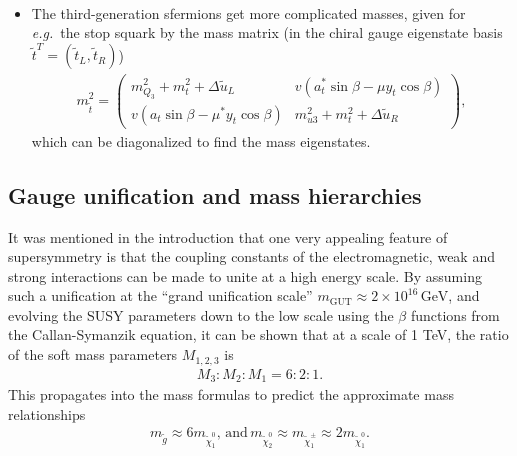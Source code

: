 \begin{itemize}
\begin{align}
 	\end{align}
 	\item The third-generation sfermions get more complicated masses, given for {\it e.g.}\ the stop squark by the mass matrix (in the chiral gauge eigenstate basis $\tilde t^T = (\tilde t_L, \tilde t_R)$)
 	\begin{align}
 		m^2_{\tilde t} = \begin{pmatrix}
 			m^2_{Q_3} + m_t^2 + \Delta \tilde u_L & v(a_t^* \sin\beta - \mu y_t \cos\beta)\\
 			v(a_t \sin\beta - \mu^* y_t \cos\beta) & m^2_{u3} + m^2_t + \Delta \tilde u_R
 		\end{pmatrix},
 	\end{align}
 	which can be diagonalized to find the mass eigenstates.
 \end{itemize}

 \subsection{Gauge unification and mass hierarchies}
 It was mentioned in the introduction that one very appealing feature of supersymmetry is that the coupling constants of the electromagnetic, weak and strong interactions can be made to unite at a high energy scale. By assuming such a unification at the ``grand unification scale'' $m_\mathrm{GUT} \approx 2\times 10^{16} \,\mathrm{GeV}$, and evolving the SUSY parameters down to the low scale using the $\beta$ functions from the Callan-Symanzik equation, it can be shown that at a scale of 1 TeV, the ratio of the soft mass parameters $M_{1,2,3}$ is
 \begin{align}
 	M_3 : M_2 : M_1 = 6 : 2 : 1.
 \end{align}
 This propagates into the mass formulas to predict the approximate mass relationships
 \begin{align}
 	m_{\tilde g} \approx 6m_{\tilde \chi_1^0}, \, \mathrm{and} \, m_{\tilde \chi_2^0} \approx m_{\tilde \chi_1^\pm} \approx 2m_{\tilde \chi_1^0}.
 \end{align}

